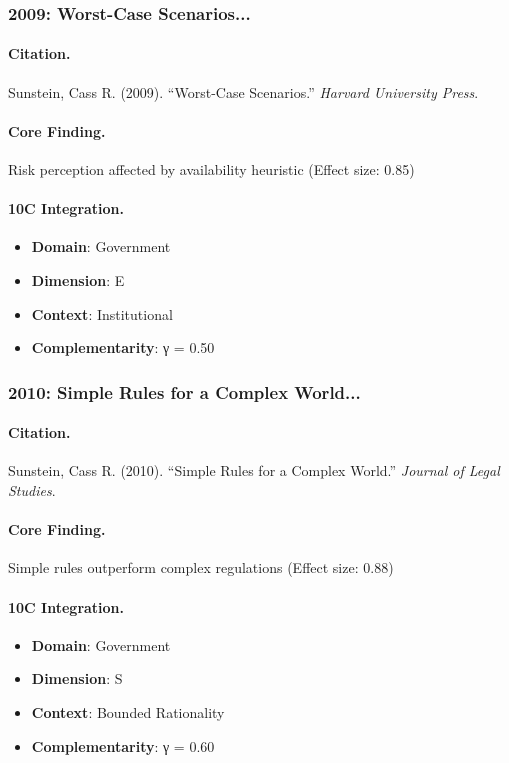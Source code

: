 \subsubsection{2009: Worst-Case Scenarios...}

\paragraph{Citation.}
Sunstein, Cass R. (2009). ``Worst-Case Scenarios.''
\textit{Harvard University Press}.

\paragraph{Core Finding.}
Risk perception affected by availability heuristic (Effect size: 0.85)

\paragraph{10C Integration.}
\begin{itemize}[nosep]
  \item \textbf{Domain}: Government
  \item \textbf{Dimension}: E
  \item \textbf{Context}: Institutional
  \item \textbf{Complementarity}: γ = 0.50
\end{itemize}

\subsubsection{2010: Simple Rules for a Complex World...}

\paragraph{Citation.}
Sunstein, Cass R. (2010). ``Simple Rules for a Complex World.''
\textit{Journal of Legal Studies}.

\paragraph{Core Finding.}
Simple rules outperform complex regulations (Effect size: 0.88)

\paragraph{10C Integration.}
\begin{itemize}[nosep]
  \item \textbf{Domain}: Government
  \item \textbf{Dimension}: S
  \item \textbf{Context}: Bounded Rationality
  \item \textbf{Complementarity}: γ = 0.60
\end{itemize}

